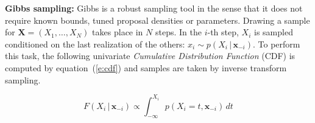 \documentclass[]{article}
\newcommand{\bvec}[1]{\textbf{#1}}
\newcommand{\pr}{p}
\begin{document}
{\bf Gibbs sampling:}
Gibbs  \citep{geman1984stochastic} is a robust sampling tool in the sense that it does not require known bounds, tuned proposal densities or parameters.
Drawing a sample for $\bvec{X} = (X_1, \ldots, X_N)$ takes place in $N$ steps.
In the $i$-th step, $X_i$ is sampled conditioned on the last realization of the others:
$x_i \sim \pr(X_i \,|\, \bvec{x}_{-i})$. 
To perform this task, the following univariate \emph{Cumulative Distribution Function} (CDF)
is computed by equation~(\ref{e:cdf}) and samples are taken by inverse transform sampling. 
{\footnotesize
\begin{equation}
F(X_i  \,|\, \bvec{x}_{-i}) 
\propto
\int_{-\infty}^{X_i} \!\!\!\! \pr(X_i = t, \bvec{x}_{-i}) \, d  t
\end{equation} 



}
\end{document}
